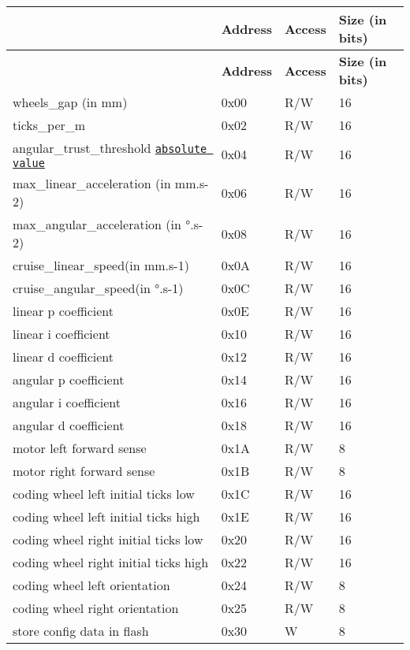 \tabulinesep=1mm
\begin{longtabu} spread 0pt [c]{*{4}{|X[-1]}|}
\hline
{}&{\bf Address}&{\bf Access}&{\bf Size (in bits)  }\\
\endfirsthead
\hline
\endfoot
\hline
{}&{\bf Address}&{\bf Access}&{\bf Size (in bits)  }\\
\endhead
wheels\+\_\+gap (in mm)&0x00&R/W&16 \\
ticks\+\_\+per\+\_\+m&0x02&R/W&16 \\
angular\+\_\+trust\+\_\+threshold \href{in °.s-1}{\tt absolute value}&0x04&R/W&16 \\
max\+\_\+linear\+\_\+acceleration (in mm.\+s-\/2)&0x06&R/W&16 \\
max\+\_\+angular\+\_\+acceleration (in °.\+s-\/2)&0x08&R/W&16 \\
cruise\+\_\+linear\+\_\+speed(in mm.\+s-\/1)&0x0A&R/W&16 \\
cruise\+\_\+angular\+\_\+speed(in °.\+s-\/1)&0x0C&R/W&16 \\
linear p coefficient&0x0E&R/W&16 \\
linear i coefficient&0x10&R/W&16 \\
linear d coefficient&0x12&R/W&16 \\
angular p coefficient&0x14&R/W&16 \\
angular i coefficient&0x16&R/W&16 \\
angular d coefficient&0x18&R/W&16 \\
motor left forward sense&0x1A&R/W&8 \\
motor right forward sense&0x1B&R/W&8 \\
coding wheel left initial ticks low&0x1C&R/W&16 \\
coding wheel left initial ticks high&0x1E&R/W&16 \\
coding wheel right initial ticks low&0x20&R/W&16 \\
coding wheel right initial ticks high&0x22&R/W&16 \\
coding wheel left orientation&0x24&R/W&8 \\
coding wheel right orientation&0x25&R/W&8 \\
store config data in flash&0x30&W&8 \\

\end{longtabu}
